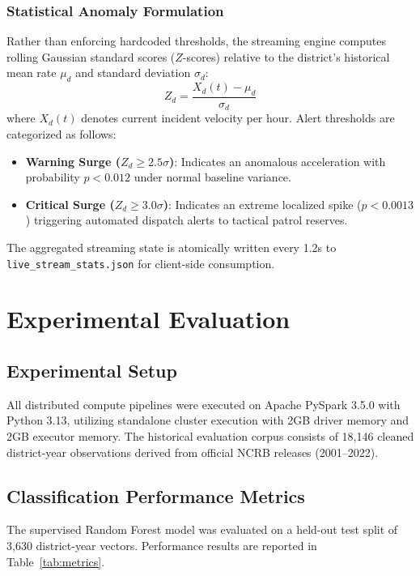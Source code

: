 \documentclass[conference]{IEEEtran}
\begin{document}
\subsubsection{Statistical Anomaly Formulation}
Rather than enforcing hardcoded thresholds, the streaming engine computes rolling Gaussian standard scores ($Z$-scores) relative to the district's historical mean rate $\mu_d$ and standard deviation $\sigma_d$:
\begin{equation}
    Z_d = \frac{X_d(t) - \mu_d}{\sigma_d}
\end{equation}
where $X_d(t)$ denotes current incident velocity per hour. 
Alert thresholds are categorized as follows:
\begin{itemize}
    \item \textbf{Warning Surge ($Z_d \ge 2.5\sigma$)}: Indicates an anomalous acceleration with probability $p < 0.012$ under normal baseline variance.
    \item \textbf{Critical Surge ($Z_d \ge 3.0\sigma$)}: Indicates an extreme localized spike ($p < 0.0013$) triggering automated dispatch alerts to tactical patrol reserves.
\end{itemize}
The aggregated streaming state is atomically written every 1.2s to \texttt{live\_stream\_stats.json} for client-side consumption.

\section{Experimental Evaluation}

\subsection{Experimental Setup}
All distributed compute pipelines were executed on Apache PySpark 3.5.0 with Python 3.13, utilizing standalone cluster execution with 2GB driver memory and 2GB executor memory. The historical evaluation corpus consists of 18,146 cleaned district-year observations derived from official NCRB releases (2001--2022).

\subsection{Classification Performance Metrics}
The supervised Random Forest model was evaluated on a held-out test split of 3,630 district-year vectors. Performance results are reported in Table~\ref{tab:metrics}.
\end{document}

